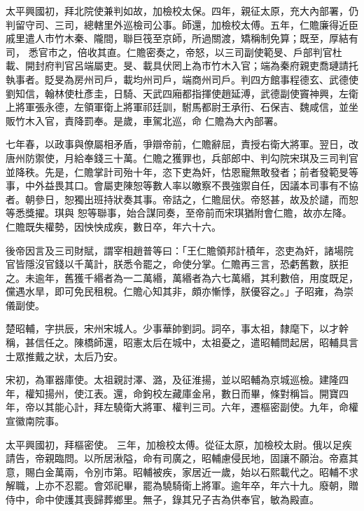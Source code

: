 \begin{pinyinscope}
 太平興國初，拜北院使兼判如故，加檢校太保。四年，親征太原，充大內部署，仍判留守司、三司，總轄里外巡檢司公事。師還，加檢校太傅。五年，仁贍廉得近臣戚里遣人市竹木秦、隴間，聯巨筏至京師，所過關渡，矯稱制免算；既至，厚結有司，
 悉官市之，倍收其直。仁贍密奏之，帝怒，以三司副使範旻、戶部判官杜載、開封府判官呂端屬吏。旻、載具伏罔上為市竹木入官；端為秦府親吏喬璉請托執事者。貶旻為房州司戶，載均州司戶，端商州司戶。判四方館事程德玄、武德使劉知信，翰林使杜彥圭，日騎、天武四廂都指揮使趙延溥，武德副使竇神興，左衛上將軍張永德，左領軍衛上將軍祁廷訓，駙馬都尉王承衎、石保吉、魏咸信，並坐販竹木入官，責降罰奉。是歲，車駕北巡，命
 仁贍為大內部署。



 七年春，以政事與僚屬相矛盾，爭辯帝前，仁贍辭屈，責授右衛大將軍。翌日，改唐州防禦使，月給奉錢三十萬。仁贍之獲罪也，兵部郎中、判勾院宋琪及三司判官並降秩。先是，仁贍掌計司殆十年，恣下吏為奸，怙恩寵無敢發者；前者發範旻等事，中外益畏其口。會屬吏陳恕等數人率以皦察不畏強禦自任，因議本司事有不協者。朝參日，恕獨出班持狀奏其事。帝詰之，仁贍屈伏。帝怒甚，故及於譴，而恕等悉獎擢。琪與
 恕等聯事，始合謀同奏，至帝前而宋琪猶附會仁贍，故亦左降。仁贍既失權勢，因怏怏成疾，數日卒，年六十六。



 後帝因言及三司財賦，謂宰相趙普等曰：「王仁贍領邦計積年，恣吏為奸，諸場院官皆隱沒官錢以千萬計，朕悉令罷之，命使分掌。仁贍再三言，恐虧舊數，朕拒之。未逾年，舊獲千緡者為一二萬緡，萬緡者為六七萬緡，其利數倍，用度既足，儻遇水旱，即可免民租稅。仁贍心知其非，頗亦慚悸，朕優容之。」子昭雍，為崇儀副使。



 楚昭輔，字拱辰，宋州宋城人。少事華帥劉詞。詞卒，事太祖，隸麾下，以才幹稱，甚信任之。陳橋師還，昭憲太后在城中，太祖憂之，遣昭輔問起居，昭輔具言士眾推戴之狀，太后乃安。



 宋初，為軍器庫使。太祖親討澤、潞，及征淮揚，並以昭輔為京城巡檢。建隆四年，權知揚州，使江表。還，命鉤校左藏庫金帛，數日而畢，條對稱旨。開寶四年，帝以其能心計，拜左驍衛大將軍、權判三司。六年，遷樞密副使。九年，命權宣徽南院事。



 太平興國初，拜樞密使。
 三年，加檢校太傅。從征太原，加檢校太尉。俄以足疾請告，帝親臨問。以所居湫隘，命有司廣之，昭輔慮侵民地，固讓不願治。帝嘉其意，賜白金萬兩，令別市第。昭輔被疾，家居近一歲，始以石熙載代之。昭輔不求解職，上亦不忍罷。會郊祀畢，罷為驍騎衛上將軍。逾年卒，年六十九。廢朝，贈侍中，命中使護其喪歸葬鄉里。無子，錄其兄子吉為供奉官，敏為殿直。




\end{pinyinscope}
